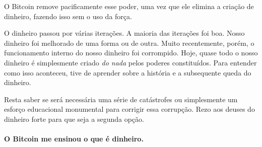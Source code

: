 O Bitcoin remove pacificamente esse poder, uma vez que ele elimina a criação de dinheiro, fazendo isso sem o uso da força.

O dinheiro passou por várias iterações. A maioria das iterações foi boa. Nosso dinheiro foi melhorado de uma forma ou de outra. Muito recentemente, porém, o funcionamento interno do nosso dinheiro foi corrompido. Hoje, quase todo o nosso dinheiro é simplesmente criado \textit{do nada} pelos poderes constituídos. Para entender como isso aconteceu, tive de aprender sobre a história e a subsequente queda do dinheiro.

Resta saber se será necessária uma série de catástrofes ou simplesmente um esforço educacional monumental para corrigir essa corrupção. Rezo aos deuses do dinheiro forte para que seja a segunda opção.

\paragraph{O Bitcoin me ensinou o que é dinheiro.}

%
%
%
%
